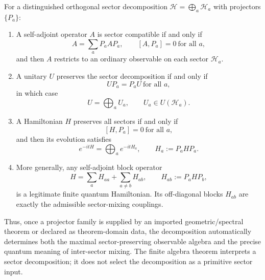 \documentclass[12pt,a4paper]{article}
\begin{document}
\begin{theorem}
\label{p4:thm:sector-compatible-observables}
For a distinguished orthogonal sector decomposition $\mathcal H=\bigoplus_a \mathcal H_a$ with projectors $\{P_a\}$:
\begin{enumerate}[label=(\roman*)]
\item A self-adjoint operator $A$ is sector compatible if and only if
\begin{equation}
\label{p4:eq:sector-compatible-form}
A=\sum_a P_aAP_a,
\qquad [A,P_a]=0\ \text{for all $a$},
\end{equation}
and then $A$ restricts to an ordinary observable on each sector $\mathcal H_a$.
\item A unitary $U$ preserves the sector decomposition if and only if
\begin{equation}
\label{p4:eq:sector-preserving-unitary}
UP_a=P_aU\ \text{for all $a$},
\end{equation}
in which case
\begin{equation}
\label{p4:eq:sector-preserving-unitary-sum}
U=\bigoplus_a U_a,
\qquad U_a\in U(\mathcal H_a).
\end{equation}
\item A Hamiltonian $H$ preserves all sectors if and only if
\begin{equation}
\label{p4:eq:sector-preserving-hamiltonian}
[H,P_a]=0\ \text{for all $a$},
\end{equation}
and then its evolution satisfies
\begin{equation}
\label{p4:eq:sector-preserving-flow}
e^{-itH}=\bigoplus_a e^{-itH_a},
\qquad H_a:=P_aHP_a.
\end{equation}
\item More generally, any self-adjoint block operator
\begin{equation}
\label{p4:eq:admissible-block-hamiltonian}
H=\sum_a H_{aa}+\sum_{a\neq b} H_{ab},
\qquad H_{ab}:=P_aHP_b,
\end{equation}
is a legitimate finite quantum Hamiltonian.
Its off-diagonal blocks $H_{ab}$ are exactly the admissible sector-mixing couplings.
\end{enumerate}
Thus, once a projector family is supplied by an imported geometric/spectral theorem or declared as theorem-domain data, the decomposition automatically determines both the maximal sector-preserving observable algebra and the precise quantum meaning of inter-sector mixing.  The finite algebra theorem interprets a sector decomposition; it does not select the decomposition as a primitive sector input.
\end{theorem}
\end{document}
